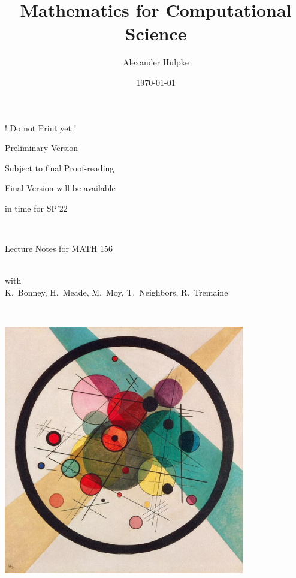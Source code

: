 \documentclass[10pt]{memoir}
\title{Mathematics for Computational Science}
\author{Alexander Hulpke}
\date{\today}
\theoremstyle{mybem}
\begin{document}
\frontmatter
\thispagestyle{empty}
\vfill
\begin{center}
{\Huge
! Do not Print yet !
\bigskip\bigskip

Preliminary Version
\bigskip\bigskip

Subject to final Proof-reading
\bigskip\bigskip

Final Version will be available 

in time for SP'22
}
\end{center}
\vfill
\newpage

\thispagestyle{empty}
\ \\
\vspace{1mm}
\begin{center}
{\huge\textbf{\thetitle}}
\bigskip

{\large Lecture Notes for MATH 156}
\bigskip
\bigskip

{\Large\theauthor}\\
{with\\ 
K.~Bonney,
H.~Meade,
M.~Moy,
T.~Neighbors,
R.~Tremaine}
\medskip

{\large\thedate}
\end{center}

\ \hspace{8cm}
\vspace{2mm}
\begin{center}
\includegraphics[width=10.5cm]{pic/Kandinsi_CirclesInACircle.jpg}
\end{center}
\vspace{5mm}
\end{document}
